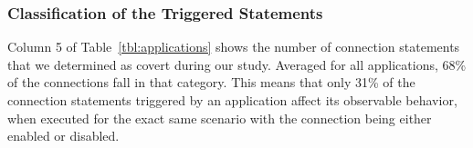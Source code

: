 

\subsubsection{Classification of the Triggered Statements}
Column 5 of Table~\ref{tbl:applications} shows the number of connection statements that we determined as covert during our study. 
Averaged for all applications, 68\% of the connections fall in that category. 
This means that only 31\% of the connection statements triggered by an application affect its observable behavior, 
when executed for the exact same scenario with the connection being either enabled or disabled.




